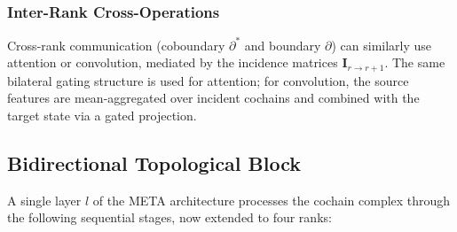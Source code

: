 \documentclass{article}
\begin{document}
\subsubsection{Inter-Rank Cross-Operations}

Cross-rank communication (coboundary $\partial^*$ and boundary $\partial$) can similarly use attention or convolution, mediated by the incidence matrices $\mathbf{I}_{r \to r+1}$. The same bilateral gating structure is used for attention; for convolution, the source features are mean-aggregated over incident cochains and combined with the target state via a gated projection.

\subsection{Bidirectional Topological Block}

A single layer $l$ of the META architecture processes the cochain complex through the following sequential stages, now extended to four ranks:
\end{document}
